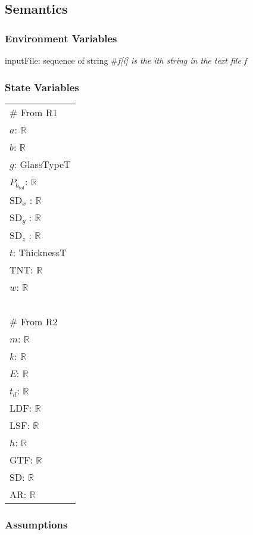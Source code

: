 \documentclass[12pt, titlepage]{article}
\begin{document}
\subsection{Semantics}

\subsubsection{Environment Variables}

inputFile: sequence of string \#\textit{f[i] is the ith string in the text file f}

\subsubsection{State Variables}

\renewcommand{\arraystretch}{1.2}
\begin{longtable*}[l]{l} 
\# From R1\\
$a$: $\mathbb{R}$ \\
$b$: $\mathbb{R}$ \\
$g$: GlassTypeT \\
$P_{b_\text{tol}}$: $\mathbb{R}$ \\
$\text{SD}_x$ : $\mathbb{R}$ \\
$\text{SD}_y$ : $\mathbb{R}$ \\
$\text{SD}_z$ : $\mathbb{R}$ \\
$t$: ThicknessT \\
TNT: $\mathbb{R}$ \\
$w$: $\mathbb{R}$ \\
~\\
\# From R2\\
$m$: $\mathbb{R}$ \\
$k$: $\mathbb{R}$ \\
$E$: $\mathbb{R}$ \\
$t_d$: $\mathbb{R}$ \\
LDF: $\mathbb{R}$ \\
LSF: $\mathbb{R}$ \\
$h$: $\mathbb{R}$ \\
GTF: $\mathbb{R}$\\
SD: $\mathbb{R}$\\
AR: $\mathbb{R}$\\
\end{longtable*}

\subsubsection{Assumptions}
\end{document}

